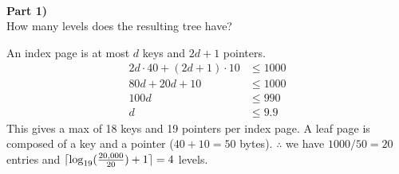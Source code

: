 \documentclass[12pt,letter]{article}
\DeclarePairedDelimiter{\ceil}{\lceil}{\rceil}
\newcommand{\ppart}[1]{\vspace{2mm}\large\textbf{\\Part
{#1})\vspace{2mm}}\normalsize\\}
\begin{document}
\ppart{1}
How many levels does the resulting tree have?

An index page is at most $d$ keys and $2d+1$ pointers. 
\begin{align*}
    2d\cdot 40 + (2d+1)\cdot 10 &\leq 1000\\
    80d + 20d + 10 &\leq 1000 \\
    100d &\leq 990 \\
    d &\leq 9.9
\end{align*}
This gives a max of 18 keys and 19 pointers per index page. A leaf page is
composed of a key and a pointer ($40 + 10 = 50$ bytes). $\therefore$ we have
$1000/50 = 20$ entries and $\ceil{\log_{19}(\frac{20,000}{20}) + 1} = 4$ levels.
\end{document}
